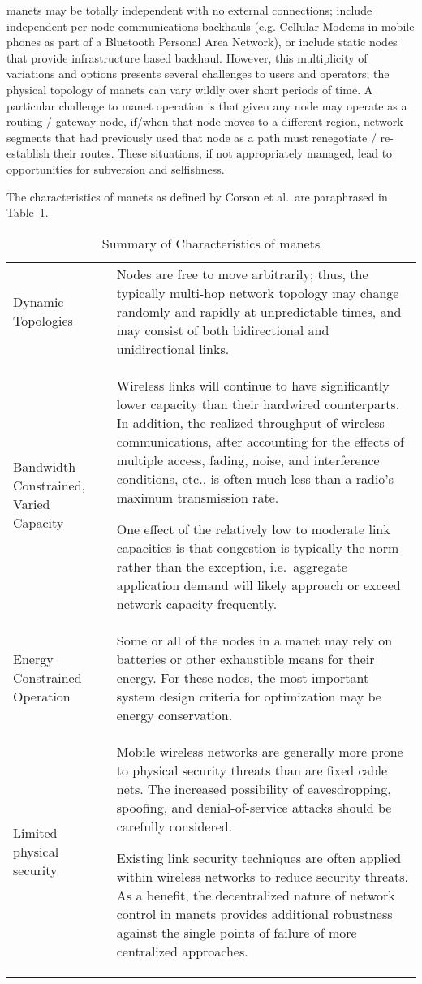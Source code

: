 \glspl{manet} may be totally independent with no external connections; include independent per-node communications backhauls (e.g. Cellular Modems in mobile phones as part of a Bluetooth Personal Area Network), or include static nodes that provide infrastructure based backhaul.
However, this multiplicity of variations and options presents several challenges to users and operators; the physical topology of \glspl{manet} can vary wildly over short periods of time.
A particular challenge to \gls{manet} operation is that given any node may operate as a routing / gateway node, if/when that node moves to a different region, network segments that had previously used that node as a path must renegotiate / re-establish their routes.
These situations, if not appropriately managed, lead to opportunities for subversion and selfishness.

The characteristics of \gls{manet}s as defined by Corson et al.\ are paraphrased in Table~\ref{tab:manet_characteristics}.

\begin{table}[h!]
\caption[Summary of Characteristics of \glspl{manet}]{Summary of Characteristics of \glspl{manet}\cite{Corson1999}}
\label{tab:manet_characteristics}
  \begin{tabularx}{\textwidth}{p{2cm}X}\toprule
    Dynamic Topologies & Nodes are free to move arbitrarily; thus, the typically multi-hop network topology may change randomly and rapidly at unpredictable times, and may consist of both bidirectional and unidirectional links.
\\
    Bandwidth Constrained, Varied Capacity & Wireless links will continue to have significantly lower capacity than their hardwired counterparts.
In addition, the realized throughput of wireless communications, after accounting for the effects of multiple access, fading, noise, and interference conditions, etc., is often much less than a radio's maximum transmission rate.
\par
One effect of the relatively low to moderate link capacities is that congestion is typically the norm rather than the exception, i.e.\  aggregate application demand will likely approach or exceed network capacity frequently.\\
    Energy Constrained Operation &  Some or all of the nodes in a \gls{manet} may rely on batteries or other exhaustible means for their energy.
For these nodes, the most important system design criteria for optimization may be energy conservation.\\
    Limited physical security & Mobile wireless networks are generally more prone to physical security threats than are fixed cable nets.
The increased possibility of eavesdropping, spoofing, and denial-of-service attacks should be carefully considered.\par
Existing link security techniques are often applied within wireless networks to reduce security threats.
As a benefit, the decentralized nature of network control in \glspl{manet} provides additional robustness against the single points of failure of more centralized approaches.\\\bottomrule
\end{tabularx}
\end{table}


